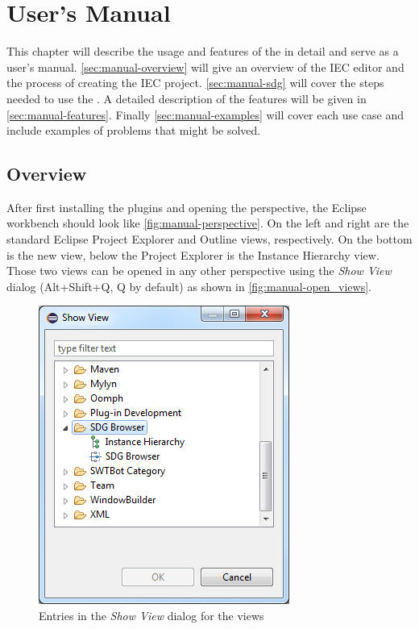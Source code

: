 \chapter{User's Manual} \label{ch:manual}

This chapter will describe the usage and features of the \SB in detail and serve as a user's manual. 
\autoref{sec:manual-overview} will give an overview of the IEC editor and the process of creating the IEC project. 
\autoref{sec:manual-sdg} will cover the steps needed to use the \SB. A detailed description of the \SB features will be 
given in \autoref{sec:manual-features}. Finally \autoref{sec:manual-examples} will cover each use case and include 
examples of problems that might be solved.


\section{Overview} \label{sec:manual-overview}

After first installing the \SB plugins and opening the \emph{\SB} perspective, the Eclipse workbench should look like 
\autoref{fig:manual-perspective}. On the left and right are the standard Eclipse Project Explorer and Outline views, 
respectively. On the bottom is the new \SB view, below the Project Explorer is the Instance Hierarchy view. Those two 
views can be opened in any other perspective using the \emph{Show View} dialog (Alt+Shift+Q, Q by default) as shown in 
\autoref{fig:manual-open_views}.

\begin{figure}[hp]
  \centering
    \includegraphics[scale=0.55]{bilder/manual-open_views}
  \caption{Entries in the \emph{Show View} dialog for the \SB views}
  \label{fig:manual-open_views}
\end{figure}

